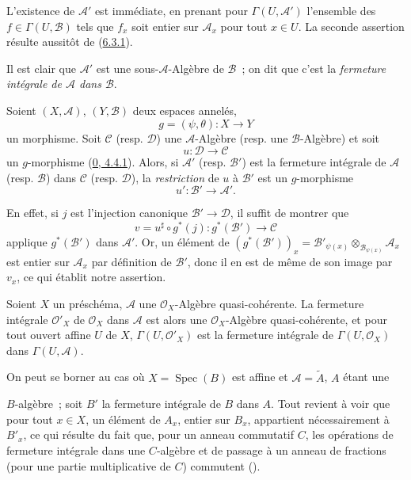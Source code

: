 L'existence de $\mathcal{A}'$ est immédiate, en prenant pour
$\Gamma(U,\mathcal{A}')$ l'ensemble des $f\in\Gamma(U,\mathcal{B})$ tels que
$f_x$ soit entier sur $\mathcal{A}_x$ pour tout $x\in U$. La seconde
assertion résulte aussitôt de (\hyperref[II.6.3.1-fr]{6.3.1}).

Il est clair que $\mathcal{A}'$ est une sous-$\mathcal{A}$-Algèbre de
$\mathcal{B}$~; on dit que c'est la \emph{fermeture intégrale de
$\mathcal{A}$ dans $\mathcal{B}$}.

\begin{env}[6.3.3]
\label{II.6.3.3-fr}
Soient $(X,\mathcal{A})$, $(Y,\mathcal{B})$ deux espaces annelés,
\[
g=(\psi,\theta):X\to Y
\]
un morphisme. Soit $\mathcal{C}$ (resp. $\mathcal{D}$) une
$\mathcal{A}$-Algèbre (resp. une $\mathcal{B}$-Algèbre) et soit
\[
u:\mathcal{D}\to\mathcal{C}
\]
un $g$-morphisme (\hyperref[0.4.4.1-fr]{0, 4.4.1}). Alors, si
$\mathcal{A}'$ (resp. $\mathcal{B}'$) est la fermeture intégrale de
$\mathcal{A}$ (resp. $\mathcal{B}$) dans $\mathcal{C}$ (resp.
$\mathcal{D}$), la \emph{restriction} de $u$ à $\mathcal{B}'$ est un
$g$-morphisme
\[
u':\mathcal{B}'\to\mathcal{A}'.
\]

En effet, si $j$ est l'injection canonique $\mathcal{B}'\to\mathcal{D}$, il
suffit de montrer que
\[
v=u^\sharp\circ g^*(j):g^*(\mathcal{B}')\to\mathcal{C}
\]
applique $g^*(\mathcal{B}')$ dans $\mathcal{A}'$. Or, un élément de
$(g^*(\mathcal{B}'))_x=\mathcal{B}'_{\psi(x)}\otimes_{\mathcal{B}_{\psi(x)}}
\mathcal{A}_x$ est entier sur $\mathcal{A}_x$ par définition de
$\mathcal{B}'$, donc il en est de même de son image par $v_x$, ce qui établit
notre assertion.
\end{env}

\begin{proposition}[6.3.4]
\label{II.6.3.4-fr}
Soient $X$ un préschéma, $\mathcal{A}$ une $\mathcal{O}_X$-Algèbre
quasi-cohérente. La fermeture intégrale $\mathcal{O}'_X$ de
$\mathcal{O}_X$ dans $\mathcal{A}$ est alors une $\mathcal{O}_X$-Algèbre
quasi-cohérente, et pour tout ouvert affine $U$ de $X$,
$\Gamma(U,\mathcal{O}'_X)$ est la fermeture intégrale de
$\Gamma(U,\mathcal{O}_X)$ dans $\Gamma(U,\mathcal{A})$.
\end{proposition}

On peut se borner au cas où $X=\operatorname{Spec}(B)$ est affine et
$\mathcal{A}=\widetilde{A}$, $A$ étant une


$B$-algèbre~; soit $B'$ la fermeture intégrale de $B$ dans $A$. Tout revient
à voir que pour tout $x\in X$, un élément de $A_x$, entier sur $B_x$,
appartient nécessairement à $B'_x$, ce qui résulte du fait que, pour un anneau
commutatif $C$, les opérations de fermeture intégrale dans une $C$-algèbre et
de passage à un anneau de fractions (pour une partie multiplicative de $C$)
commutent (\cite[t.~I, p.~261 et 257]{I-13}).


